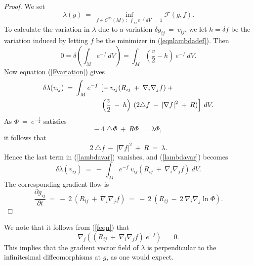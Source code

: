 \begin{proof}
We set
\begin{equation}
\label{eqnlambdadef}
\lambda(g) \: = \: \inf_{f \in C^\infty(M)
\: : \: \int_M e^{-f} \: dV \: = \: 1}
{\mathcal F}(g, f).
\end{equation}
To calculate the variation in $\lambda$
due to a variation $\delta g_{ij} \: = \: v_{ij}$,
we let $h=\delta f$ be the variation induced by letting $f$ be the
minimizer in (\ref{eqnlambdadef}). Then
\begin{equation}
0=\delta \left(\int_M e^{-f}\: dV\right) = \int_M \left(\frac{v}{2}-h\right)\:e^{-f}\:dV.
\end{equation}
Now  equation
(\ref{Fvariation}) gives
\begin{align} \label{lambdavar}
\delta \lambda(v_{ij})
\: = \:
\int_M e^{-f} \: & \left[  - \: v_{ij}
(R_{ij} \: + \: \nabla_i \nabla_j f) \: + \right. \\
& \left. \left( \frac{v}{2} \: - \: h \right) \: (2 \triangle f \: - \:
|\nabla f|^2 \: + \: R) \right] \: dV. \notag
\end{align}
As $\Phi \: = \: e^{-\frac{f}{2}}$ satisfies
\begin{equation}
- \: 4 \: \triangle \Phi \: + \: R \Phi \: = \: \lambda \Phi,
\end{equation}
it follows that
\begin{equation} \label{feqn}
2 \: \triangle f \: - \: | \nabla f|^2 \: + \: R \: = \: \lambda.
\end{equation}
Hence the last term in (\ref{lambdavar}) vanishes, and
(\ref{lambdavar}) becomes
\begin{equation}
\delta \lambda(v_{ij})
\: = \:
- \: \int_M e^{-f} \: v_{ij}
(R_{ij} \: + \: \nabla_i \nabla_j f) \: dV.
\end{equation}
The corresponding gradient flow is
\begin{equation} \label{gradflow}
\frac{\partial g_{ij}}{\partial t} \: = \:
- \: 2 \: \left( R_{ij} \: + \: \nabla_i \nabla_j f
\right)\: = \:
- \: 2 \: \left( R_{ij} \: - \: 2 \: \nabla_i \nabla_j \ln \Phi
\right).
\end{equation}
\end{proof}

We note that it follows from (\ref{feqn}) that
\begin{equation}
\nabla_j \left( (R_{ij} \: + \: \nabla_i \nabla_j f) \: e^{-f} \right)
\: = \: 0.
\end{equation}
This implies that the gradient vector field of $\lambda$ is perpendicular
to the infinitesimal diffeomorphisms at $g$, as one would expect.

